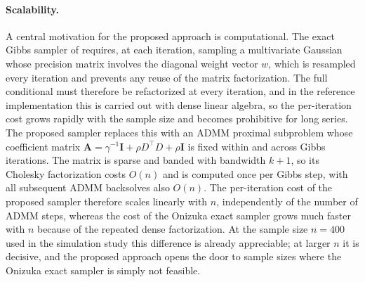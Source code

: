 \paragraph{Scalability.}
A central motivation for the proposed approach is computational. The exact Gibbs sampler of \citet{onizuka2024fast} requires, at each iteration, sampling a multivariate Gaussian whose precision matrix involves the diagonal weight vector $w$, which is resampled every iteration and prevents any reuse of the matrix factorization. The full conditional must therefore be refactorized at every iteration, and in the reference implementation this is carried out with dense linear algebra, so the per-iteration cost grows rapidly with the sample size and becomes prohibitive for long series. The proposed sampler replaces this with an ADMM proximal subproblem whose coefficient matrix $\mathbf{A} = \gamma^{-1}\mathbf{I} + \rho D^\top D + \rho\mathbf{I}$ is fixed within and across Gibbs iterations. The matrix is sparse and banded with bandwidth $k+1$, so its Cholesky factorization costs $O(n)$ and is computed once per Gibbs step, with all subsequent ADMM backsolves also $O(n)$. The per-iteration cost of the proposed sampler therefore scales linearly with $n$, independently of the number of ADMM steps, whereas the cost of the Onizuka exact sampler grows much faster with $n$ because of the repeated dense factorization. At the sample size $n = 400$ used in the simulation study this difference is already appreciable; at larger $n$ it is decisive, and the proposed approach opens the door to sample sizes where the Onizuka exact sampler is simply not feasible.

